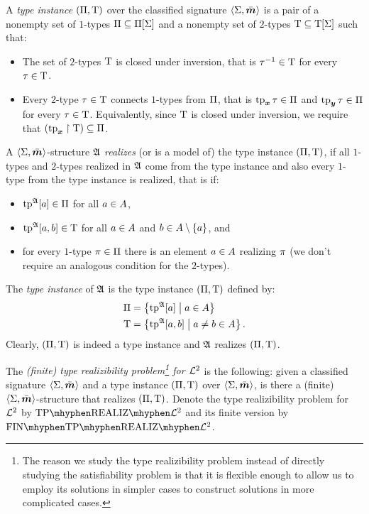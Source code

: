 \begin{definition}\label{def:tpinst-twovar}
A \emph{type instance} $(\Pi,\mathrm{T})$ over the classified
signature $\left\langle \mathrm{\Sigma},\bar{\bm{m}} \right\rangle$ is a pair of a nonempty set of $1$-types
$\Pi\subseteq\Pi[\mathrm{\Sigma}]$ and a nonempty set of $2$-types
$\mathrm{T}\subseteq\mathrm{T}[\mathrm{\Sigma}]$ such that:
\begin{itemize}
  \item The set of $2$-types $\mathrm{T}$ is closed under inversion, that is
  $\tau^{-1}\in\mathrm{T}$ for every $\tau\in\mathrm{T}$.
  \item Every $2$-type $\tau\in\mathrm{T}$ connects $1$-types from $\Pi$,
  that is $\operatorname{tp}_{\bm{x}}\tau\in\Pi$ and $\operatorname{tp}_{\bm{y}}\tau\in\Pi$ for every $\tau\in\mathrm{T}$.
  Equivalently, since $\mathrm{T}$ is closed under inversion, we require that
  $(\operatorname{tp}_{\bm{x}}\restriction\mathrm{T})\subseteq\Pi$.
\end{itemize}

A $\left\langle \mathrm{\Sigma},\bar{\bm{m}} \right\rangle$-structure $\mathfrak{A}$ \emph{realizes} (or is a model of) the
type instance $(\Pi,\mathrm{T})$, if all $1$-types and $2$-types realized in
$\mathfrak{A}$ come from the type instance and also every $1$-type from the type
instance is realized, that is if:
\begin{itemize}
  \item $\operatorname{tp}^{\mathfrak{A}}[a] \in \Pi$ for all $a\in A$,
  \item $\operatorname{tp}^{\mathfrak{A}}[a,b] \in \mathrm{T}$ for all $a\in A$ and
  $b \in A\setminus\left\{a\right\}$, and
  \item for every $1$-type $\pi \in \Pi$ there is an element $a \in A$
realizing $\pi$ (we don't require an analogous condition for the $2$-types).
\end{itemize}

The \emph{type instance} of $\mathfrak{A}$ is the type instance $(\Pi,\mathrm{T})$
defined by:
\begin{align*}
  \Pi &= \left\{\operatorname{tp}^{\mathfrak{A}}[a]\mathrel{}\middle|\mathrel{}a \in A\right\} \\
  \mathrm{T} &= \left\{\operatorname{tp}^{\mathfrak{A}}[a,b]\mathrel{}\middle|\mathrel{}a\neq b \in A\right\}.
\end{align*}
Clearly, $(\Pi,\mathrm{T})$ is indeed a type instance and $\mathfrak{A}$ realizes
$(\Pi,\mathrm{T})$.

The \emph{(finite) type realizibility problem\footnote{The reason we study the
type realizibility problem instead of directly studying the satisfiability problem is that it is flexible enough to allow us to employ its
solutions in simpler cases to construct solutions in more complicated cases.}
for $\mathcal{L}^{2}$} is the following:
given a classified signature $\left\langle \mathrm{\Sigma},\bar{\bm{m}} \right\rangle$ and a type instance
$(\Pi,\mathrm{T})$ over $\left\langle \mathrm{\Sigma},\bar{\bm{m}} \right\rangle$, is there a (finite)
$\left\langle \mathrm{\Sigma},\bar{\bm{m}} \right\rangle$-structure that realizes $(\Pi,\mathrm{T})$.
Denote the type realizibility problem for $\mathcal{L}^{2}$ by
$\Real{\vFo2}$ and its finite version by $\FinReal{\vFo2}$.
\end{definition}

